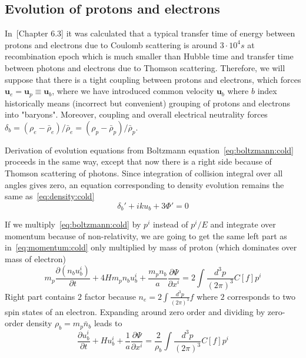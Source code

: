 \documentclass[12pt]{extarticle}
\numberwithin{problem}{section}
\numberwithin{theorem}{section}
\begin{document}
	\subsection{Evolution of protons and electrons}
	In~\cite{gorbunov-rubakov-1:2017}[Chapter 6.3] it was calculated that a typical transfer time of energy between protons and electrons due to Coulomb scattering is around $3\cdot 10^4s$ at recombination epoch which is much smaller than Hubble time and transfer time between photons and electrons due to Thomson scattering. Therefore, we will suppose that there is a tight coupling between protons and electrons, which forces $\mathbf{u}_e = \mathbf{u}_p \equiv \mathbf{u}_b$, where we have introduced common velocity $\mathbf{u}_b$ where $b$ index historically means (incorrect but convenient) grouping of protons and electrons into "baryons". Moreover, coupling and overall electrical neutrality forces $\delta_b = (\rho_e - \bar{\rho}_e) / \bar{\rho}_e = (\rho_p - \bar{\rho}_p) / \bar{\rho}_p$.
	
	Derivation of evolution equations from Boltzmann equation~\ref{eq:boltzmann:cold} proceeds in the same way, except that now there is a right side because of Thomson scattering of photons. Since integration of collision integral over all angles gives zero, an equation corresponding to density evolution remains the same as~\ref{eq:density:cold}
	\begin{equation}
		\delta_b' + iku_b + 3\Phi' = 0		
	\end{equation}

	If we multiply~\ref{eq:boltzmann:cold} by $p^i$ instead of $p^i/E$ and integrate over momentum because of non-relativity, we are going to get the same left part as in~\ref{eq:momentum:cold} only multiplied by mass of proton (which dominates over mass of electron)
	\begin{equation}
		m_p\frac{\partial(n_bu_b^i)}{\partial t} + 4Hm_pn_bu_b^i + \frac{m_pn_b}{a}\frac{\partial \Psi}{\partial x^i} = 2\int \frac{d^3p}{(2\pi)^3} C[f]p^i
	\end{equation}
	Right part contains $2$ factor because $n_e = 2\int\frac{d^3p}{(2\pi)^3}f$ where $2$ corresponds to two spin states of an electron. Expanding around zero order and dividing by zero-order density $\rho_b = m_p\bar{n}_b$ leads to
	\begin{equation}
		\frac{\partial u^i_b}{\partial t} + Hu^i_b + \frac{1}{a}\frac{\partial\Psi}{\partial x^i} = \frac{2}{\rho_b}\int\frac{d^3p}{(2\pi)^3} C[f]p^i
	\end{equation}
\end{document}
